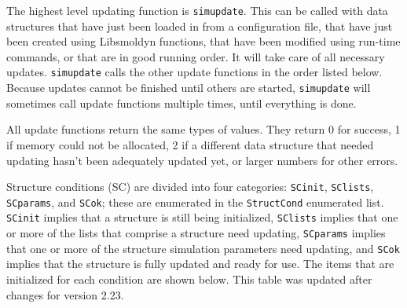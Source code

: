 \documentclass {book}
\begin{document}
The highest level updating function is \texttt{simupdate}.  This can be called with data structures that have just been loaded in from a configuration file, that have just been created using Libsmoldyn functions, that have been modified using run-time commands, or that are in good running order.  It will take care of all necessary updates.  \texttt{simupdate} calls the other update functions in the order listed below.  Because updates cannot be finished until others are started, \texttt{simupdate} will sometimes call update functions multiple times, until everything is done.

All update functions return the same types of values.  They return 0 for success, 1 if memory could not be allocated, 2 if a different data structure that needed updating hasn't been adequately updated yet, or larger numbers for other errors.

Structure conditions (SC) are divided into four categories: \texttt{SCinit}, \texttt{SClists}, \texttt{SCparams}, and \texttt{SCok}; these are enumerated in the \texttt{StructCond} enumerated list.  \texttt{SCinit} implies that a structure is still being initialized, \texttt{SClists} implies that one or more of the lists that comprise a structure need updating, \texttt{SCparams} implies that one or more of the structure simulation parameters need updating, and \texttt{SCok} implies that the structure is fully updated and ready for use.  The items that are initialized for each condition are shown below.  This table was updated after changes for version 2.23.
\end{document}
